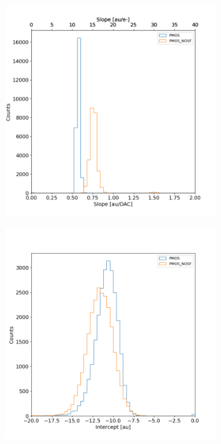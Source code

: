         \begin{figure}[h!]
            \begin{subfigure}{.5\textwidth}
            \centering
            \includegraphics[width=.98\linewidth]{figures/charaterization/slope_histogram.png}
            \caption{}
            \label{fig:}
            \end{subfigure}
            \begin{subfigure}{.5\textwidth}
            \centering
            \includegraphics[width=.98\linewidth]{figures/charaterization/intercept_histogram.png}
            \caption{}
            \label{fig:}
            \end{subfigure}
        \end{figure} 

